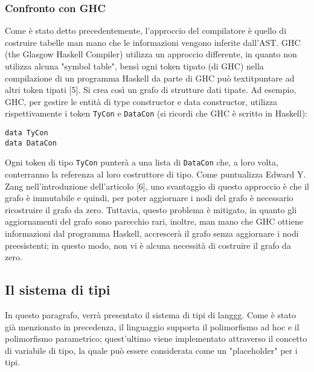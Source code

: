 \documentclass[10pt,a4paper]{article}
\begin{document}
\subsubsection{Confronto con GHC}
Come è stato detto precedentemente, l'approccio del compilatore è quello di costruire tabelle man mano che le informazioni
vengono inferite dall'AST. GHC (the Glasgow Haskell Compiler) utilizza un approccio differente, in quanto non utilizza
alcuna "symbol table", bensì ogni token tipato (di GHC) nella compilazione di un programma Haskell da parte di GHC può
textit{puntare} ad altri token tipati [5]. Si crea così un grafo di strutture dati tipate. Ad esempio, GHC, per gestire
le entità di type constructor e data constructor, utilizza rispettivamente i token \texttt{TyCon} e \texttt{DataCon} (si
ricordi che GHC è scritto in Haskell):
\begin{lstlisting}
data TyCon
data DataCon
\end{lstlisting}
Ogni token di tipo \texttt{TyCon} punterà a una lista di \texttt{DataCon} che, a loro volta, conterranno la referenza
al loro costruttore di tipo. Come puntualizza Edward Y. Zang nell'introduzione dell'articolo [6],
uno svantaggio di questo approccio è che il grafo è immutabile e quindi, per poter
aggiornare i nodi del grafo è necessario ricostruire il grafo da zero. Tuttavia, questo problema è mitigato, in quanto
gli aggiornamenti del grafo sono parecchio rari, inoltre, man mano che GHC ottiene informazioni dal programma Haskell,
accrescerà il grafo senza aggiornare i nodi preesistenti; in questo modo, non vi è alcuna necessità di costruire il
grafo da zero.

\subsection{Il sistema di tipi}
In questo paragrafo, verrà presentato il sistema di tipi di langgg. Come è stato già menzionato in precedenza, il
linguaggio supporta il polimorfismo ad hoc e il polimorfismo parametrico; quest'ultimo viene implementato attraverso
il concetto di variabile di tipo, la quale può essere considerata come un "placeholder" per i tipi.
\end{document}

